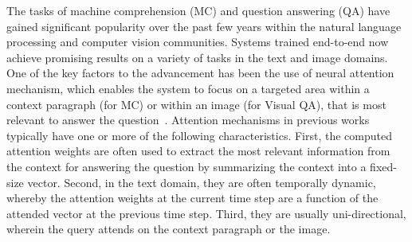 The tasks of machine comprehension (MC) and question answering (QA) have gained significant popularity over the past few years within the natural language processing and computer vision communities. Systems trained end-to-end now achieve promising results on a variety of tasks in the text and image domains. 
One of the key factors to the advancement has been the use of neural attention mechanism, which enables the system to focus on a targeted area within a context paragraph (for MC) or within an image (for Visual QA), that is most relevant to answer the question~\citep{memnn,antol2015vqa,xiong2016dynamic}. 
Attention mechanisms in previous works typically have one or more of the following characteristics. 
First, the computed attention weights are often used to extract the most relevant information from the context for answering the question by summarizing the context into a fixed-size vector.
Second, in the text domain, they are often temporally dynamic, whereby the attention weights at the current time step are a function of the attended vector at the previous time step. 
Third, they are usually uni-directional, wherein the query attends on the context paragraph or the image. 

